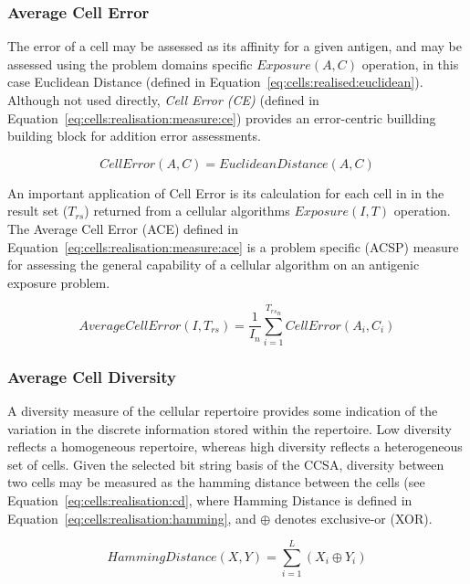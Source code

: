 %
%
\subsubsection{Average Cell Error}
The error of a cell may be assessed as its affinity for a given antigen, and may be assessed using the problem domains specific $Exposure(A, C)$ operation, in this case Euclidean Distance (defined in Equation~\ref{eq:cells:realised:euclidean}). Although not used directly, \emph{Cell Error (CE)} (defined in Equation~\ref{eq:cells:realisation:measure:ce}) provides an error-centric buillding building block for addition error assessments.

\begin{equation}
	CellError(A,C) = EuclideanDistance(A, C)
	\label{eq:cells:realisation:measure:ce}
\end{equation}

An important application of Cell Error is its calculation for each cell in in the result set ($T_{rs}$) returned from a cellular algorithms $Exposure(I, T)$ operation. The Average Cell Error (ACE) defined in Equation~\ref{eq:cells:realisation:measure:ace} is a problem specific (ACSP) measure for assessing the general capability of a cellular algorithm on an antigenic exposure problem.

\begin{equation}
	AverageCellError(I,T_{rs}) = \frac{1}{I_n} \sum_{i=1}^{{T_{rs}}_n} CellError(A_i, C_i)
	\label{eq:cells:realisation:measure:ace}
\end{equation}

%
%
\subsubsection{Average Cell Diversity}
A diversity measure of the cellular repertoire provides some indication of the variation in the discrete information stored within the repertoire. Low diversity reflects a homogeneous repertoire, whereas high diversity reflects a heterogeneous set of cells. Given the selected bit string basis of the CCSA, diversity between two cells may be measured as the hamming distance between the cells (see Equation~\ref{eq:cells:realisation:cd}, where Hamming Distance is defined in Equation~\ref{eq:cells:realisation:hamming}, and $\oplus$ denotes exclusive-or (XOR).

\begin{equation}
	HammingDistance(X, Y) = \sum_{i=1}^L \left( X_i \oplus Y_i \right)
	\label{eq:cells:realisation:hamming}
\end{equation}

